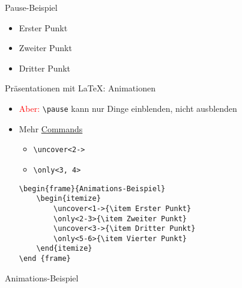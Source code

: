\documentclass[main.tex]{subfiles}
\begin{document}
\begin{frame}{Pause-Beispiel}
    \begin{itemize}
        \item Erster Punkt
        \pause
        \item Zweiter Punkt
        \pause
        \item Dritter Punkt
    \end{itemize}
\end {frame}

\begin{frame}[fragile]{Präsentationen mit \LaTeX: Animationen}
    \begin{itemize}
        \item \textcolor{red}{Aber:} \verb|\pause| kann nur Dinge einblenden, nicht ausblenden
        \medskip
        \pause
        \item Mehr \href{https://tex.stackexchange.com/a/684646}{Commands}
        \begin{itemize}
            \item \verb|\uncover<2->|
            \item \verb|\only<3, 4>|
        \end{itemize}
        \pause
        \medskip
        \begin{verbatim}
\begin{frame}{Animations-Beispiel}
    \begin{itemize}
        \uncover<1->{\item Erster Punkt}
        \only<2-3>{\item Zweiter Punkt}
        \uncover<3->{\item Dritter Punkt}
        \only<5-6>{\item Vierter Punkt}
    \end{itemize}
\end {frame}
        \end{verbatim}
    \end{itemize}
\end{frame}

\begin{frame}{Animations-Beispiel}
    \begin{itemize}
    \end{itemize}
\end{frame}
\end{document}
